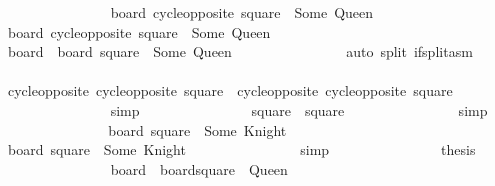 \begin{isabellebody}
\ \ \ \ \ \ \ \ \ \ \ \ \ \ \isamarkupfalse%
\ {\isacharbackquoteopen}board{\isacharprime}{\isacharprime}\ {\isacharparenleft}cycle{\isacharunderscore}opposite\ square{\isacharparenright}\ {\isacharequal}\ Some\ Queen{\isacharbackquoteclose}\isanewline
\ \ \ \ \ \ \ \ \ \ \ \ \ \ \isamarkupfalse%
\ {\isacharbackquoteopen}board{\isacharprime}\ {\isacharparenleft}cycle{\isacharunderscore}opposite\ square{\isacharparenright}\ {\isasymnoteq}\ Some\ Queen{\isacharbackquoteclose}\isanewline
\ \ \ \ \ \ \ \ \ \ \ \ \ \ \isamarkupfalse%
\ {\isacharbackquoteopen}board{\isacharprime}{\isacharprime}\ {\isacharequal}\ board{\isacharprime}\ {\isacharparenleft}square{\isacharprime}{\isacharprime}\ {\isacharcolon}{\isacharequal}\ Some\ Queen{\isacharparenright}{\isacharbackquoteclose}\isanewline
\ \ \ \ \ \ \ \ \ \ \ \ \ \ \isamarkupfalse%
\ {\isacharparenleft}auto\ split{\isacharcolon}\ if{\isacharunderscore}split{\isacharunderscore}asm{\isacharparenright}\isanewline
\ \ \ \ \ \ \ \ \ \ \ \ \isamarkupfalse%
\ \isamarkupfalse%
\ {\isachardoublequoteopen}cycle{\isacharunderscore}opposite\ {\isacharparenleft}cycle{\isacharunderscore}opposite\ square{\isacharprime}{\isacharparenright}\ {\isacharequal}\ cycle{\isacharunderscore}opposite\ {\isacharparenleft}cycle{\isacharunderscore}opposite\ square{\isacharparenright}{\isachardoublequoteclose}\isanewline
\ \ \ \ \ \ \ \ \ \ \ \ \ \ \isamarkupfalse%
\ simp\isanewline
\ \ \ \ \ \ \ \ \ \ \ \ \isamarkupfalse%
\ \isamarkupfalse%
\ {\isachardoublequoteopen}square{\isacharprime}\ {\isacharequal}\ square{\isachardoublequoteclose}\isanewline
\ \ \ \ \ \ \ \ \ \ \ \ \ \ \isamarkupfalse%
\ simp\isanewline
\ \ \ \ \ \ \ \ \ \ \ \ \isamarkupfalse%
\ \isamarkupfalse%
\ {\isachardoublequoteopen}board{\isacharprime}\ square\ {\isacharequal}\ Some\ Knight{\isachardoublequoteclose}\isanewline
\ \ \ \ \ \ \ \ \ \ \ \ \ \ \isamarkupfalse%
\ {\isacharbackquoteopen}board{\isacharprime}\ square{\isacharprime}\ {\isacharequal}\ Some\ Knight{\isacharbackquoteclose}\isanewline
\ \ \ \ \ \ \ \ \ \ \ \ \ \ \isamarkupfalse%
\ simp\isanewline
\ \ \ \ \ \ \ \ \ \ \ \ \isamarkupfalse%
\ \isamarkupfalse%
\ {\isacharquery}thesis\isanewline
\ \ \ \ \ \ \ \ \ \ \ \ \ \ \isamarkupfalse%
\ {\isacartoucheopen}board{\isacharprime}{\isacharprime}\ {\isacharequal}\ board{\isacharprime}{\isacharparenleft}square{\isacharprime}{\isacharprime}\ {\isasymmapsto}\ Queen{\isacharparenright}{\isacartoucheclose}\isanewline

\end{isabellebody}
